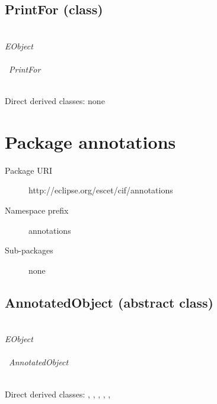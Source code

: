 \subsection{PrintFor (class)}\label{cifclass:PrintFor}
\clsdocuPrintFor

~\\ \noindent \emph{EObject} \\
\hook~ \\
\hookindent\hook~\emph{PrintFor}

~\\ \noindent Direct derived classes:
none

\begin{description}
{\featdocuPositionObjectposition}
{\featdocuPrintForevent}
{\featdocuPrintForkind}
\end{description}



\section{Package annotations}\label{cifpkg:annotations}
\pkgdocuannotations

\begin{description}
\item[Package URI] http://eclipse.org/escet/cif/annotations
\item[Namespace prefix] annotations
\item[Sub-packages] none
\end{description}

\subsection{AnnotatedObject (abstract class)}\label{cifclass:AnnotatedObject}
\clsdocuAnnotatedObject

~\\ \noindent \emph{EObject} \\
\hook~ \\
\hookindent\hook~\emph{AnnotatedObject}

~\\ \noindent Direct derived classes:
, , , , , 

